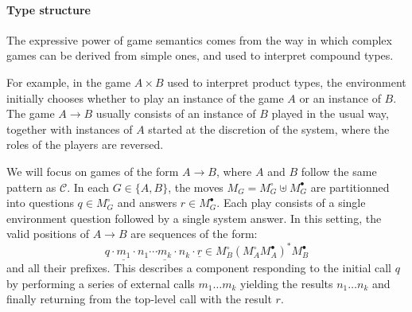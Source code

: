\documentclass[sigplan,10pt,review,anonymous]{acmart}
\newcommand{\kw}[1]{\ensuremath{ \mathsf{#1} }}
\newcommand{\que}{\circ}
\newcommand{\ans}{\bullet}
\begin{document}


\paragraph{Type structure} \label{sec:mainideas:gs:types} %

The expressive power of game semantics
comes from the way in which complex games can be derived from simple ones,
and used to interpret compound types.

For example,
in the game $A \times B$ used to interpret product types,
the environment initially chooses whether to play
an instance of the game $A$ or an instance of $B$.
The game $A \rightarrow B$ usually consists of
an instance of $B$ played in the usual way,
together with instances of $A$
started at the discretion of the system,
where the roles of the players are reversed.

We will focus on games of the form $A \rightarrow B$,
where $A$ and $B$ follow the same pattern as $\mathcal{C}$.
In each $G \in \{A, B\}$,
the moves $M_G = M_G^\que \uplus M_G^\ans$ are partitionned into
questions $q \in M_G^\que$ and answers $r \in M_G^\ans$.
Each play consists of a single environment question
followed by a single system answer.
In this setting,
the valid positions of $A \rightarrow B$ are
sequences of the form:
\[
  q \cdot \underline{m_1} \cdot n_1 \cdots
          \underline{m_k} \cdot n_k \cdot \underline{r} \in
  M_B^\que ( {M_A^\que} M_A^\ans )^* {M_B^\ans}
\]
and all their prefixes.
This describes a component responding to
the initial call $q$ by
performing a series of external calls $m_1 \ldots m_k$
yielding the results $n_1 \ldots n_k$
and finally returning from the top-level call
with the result $r$.


\end{document}
